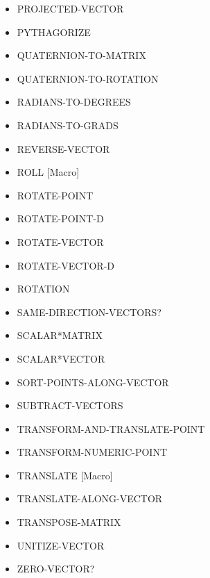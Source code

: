 \documentclass [11pt]{book}
\begin{document}
\begin{itemize}
\item {}PROJECTED-VECTOR

\item {}PYTHAGORIZE

\item {}QUATERNION-TO-MATRIX

\item {}QUATERNION-TO-ROTATION

\item {}RADIANS-TO-DEGREES

\item {}RADIANS-TO-GRADS

\item {}REVERSE-VECTOR

\item {}ROLL [Macro]

\item {}ROTATE-POINT

\item {}ROTATE-POINT-D

\item {}ROTATE-VECTOR

\item {}ROTATE-VECTOR-D

\item {}ROTATION

\item {}SAME-DIRECTION-VECTORS?

\item {}SCALAR*MATRIX

\item {}SCALAR*VECTOR

\item {}SORT-POINTS-ALONG-VECTOR

\item {}SUBTRACT-VECTORS

\item {}TRANSFORM-AND-TRANSLATE-POINT

\item {}TRANSFORM-NUMERIC-POINT

\item {}TRANSLATE [Macro]

\item {}TRANSLATE-ALONG-VECTOR

\item {}TRANSPOSE-MATRIX

\item {}UNITIZE-VECTOR

\item {}ZERO-VECTOR?

\end{itemize}
\end{document}
